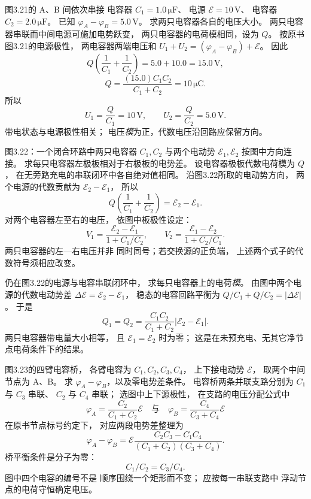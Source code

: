 图3.21的 A、B 间依次串接
电容器 $C_1=1.0\,\mathrm{\mu F}$、
电源 $\mathcal E=10\,\mathrm V$、
电容器 $C_2=2.0\,\mathrm{\mu F}$。
已知 $\varphi_A-\varphi_B=5.0\,\mathrm V$。
求两只电容器各自的电压大小。
\exsolution
两只电容器串联而中间电源可施加电势跃变，
两只电容器的电荷模相同，设为 $Q$。
按原书图3.21的电源极性，
两电容器两端电压和
$U_1+U_2=(\varphi_A-\varphi_B)+\mathcal E$。
因此
\[
Q\left(\frac1{C_1}+\frac1{C_2}\right)
=5.0+10.0=15.0\,\mathrm V,
\]
\[
Q=\frac{(15.0)C_1C_2}{C_1+C_2}
=10\,\mathrm{\mu C}.
\]
所以
\[
\boxed{U_1=\frac Q{C_1}=10\,\mathrm V},
\qquad
\boxed{U_2=\frac Q{C_2}=5.0\,\mathrm V}.
\]
\excheck 带电状态与电源极性相关；
电压\emph{模}为正，代数电压沿回路应保留方向。

图3.22：一个闭合环路中两只电容器
$C_1,C_2$ 与两个电动势
$\mathcal E_1,\mathcal E_2$ 按图中方向连接。
求每只电容器左极板相对于右极板的电势差。
\exsolution
设电容器极板代数电荷模为 $Q$，
在无旁路充电的串联闭环中各自绝对值相同。
沿图3.22所取的电动势方向，
两个电源的代数贡献为
$\mathcal E_2-\mathcal E_1$，
所以
\[
Q\left(\frac1{C_1}+\frac1{C_2}\right)
=\mathcal E_2-\mathcal E_1.
\]
对两个电容器左至右的电压，
依图中板极性设定：
\[
\boxed{V_1=\frac{\mathcal E_2-\mathcal E_1}
{1+C_1/C_2}},\qquad
\boxed{V_2=\frac{\mathcal E_1-\mathcal E_2}
{1+C_2/C_1}}.
\]
\excheck 两只电容器的左—右电压并非
同时同号；若交换源的正负端，
上述两个式子的代数符号须相应改变。

仍在图3.22的电源与电容串联闭环中，
求每只电容器上的电荷\emph{模}。
\exsolution
由图中两个电源的代数电动势差
$\Delta\mathcal E=\mathcal E_2-\mathcal E_1$，
稳态的电容回路平衡为
$Q/C_1+Q/C_2=|\Delta\mathcal E|$。
于是
\[
\boxed{Q_1=Q_2=
\frac{C_1C_2}{C_1+C_2}
|\mathcal E_2-\mathcal E_1|}.
\]
\excheck 两只电容器带电量大小相等，
且 $\mathcal E_1=\mathcal E_2$ 时为零；
这是在未预充电、无其它净节点电荷条件下的结果。

图3.23的四臂电容桥，
各臂电容为 $C_1,C_2,C_3,C_4$，
上下接电动势 $\mathcal E$，
取两个中间节点为 A、B。
求 $\varphi_A-\varphi_B$，以及零电势差条件。
\exsolution
电容桥两条并联支路分别为
$C_1$ 与 $C_3$ 串联、
$C_2$ 与 $C_4$ 串联；
选图中上下源极性，
在支路的电压分配公式中
\[
\varphi_A=\frac{C_2}{C_1+C_2}\mathcal E
\quad\text{与}\quad
\varphi_B=\frac{C_4}{C_3+C_4}\mathcal E
\]
在原书节点标号约定下，
对应两段电势差整理为
\[
\boxed{\varphi_A-\varphi_B=
\mathcal E\frac{C_2C_3-C_1C_4}
{(C_1+C_2)(C_3+C_4)}}.
\]
桥平衡条件是分子为零：
\[
\boxed{C_1/C_2=C_3/C_4}.
\]
\excheck 图中四个电容的编号不是
顺序围绕一个矩形而不变；
应按每一串联支路中
浮动节点的电荷守恒确定电压。

